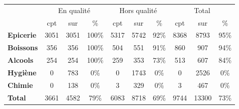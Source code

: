 \begin{tabular}{|l|ccc|ccc|ccc|}
\toprule
{} & \multicolumn{3}{c}{En qualité} & \multicolumn{3}{c}{Hors qualité} & \multicolumn{3}{c}{Total} \\
{} &        cpt &  sur &    \% &          cpt &  sur &   \% &   cpt &   sur &   \% \\
\midrule
\textbf{Epicerie} &       3051 & 3051 & 100\% &         5317 & 5742 & 92\% &  8368 &  8793 & 95\% \\
\textbf{Boissons} &        356 &  356 & 100\% &          504 &  551 & 91\% &   860 &   907 & 94\% \\
\textbf{Alcools } &        254 &  254 & 100\% &          259 &  353 & 73\% &   513 &   607 & 84\% \\
\textbf{Hygiène } &          0 &  783 &   0\% &            0 & 1743 &  0\% &     0 &  2526 &  0\% \\
\textbf{Chimie  } &          0 &  138 &   0\% &            3 &  329 &  0\% &     3 &   467 &  0\% \\
\textbf{Total   } &       3661 & 4582 &  79\% &         6083 & 8718 & 69\% &  9744 & 13300 & 73\% \\
\bottomrule
\end{tabular}

